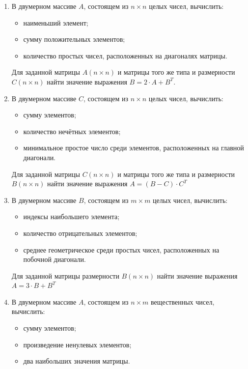 \begin{enumerate}
\item В двумерном массиве $A$, состоящем из $n\times n$ целых чисел, вычислить: 
\begin{itemize}
\item наименьший элемент;
\item сумму положительных элементов;
\item количество простых чисел, расположенных на диагоналях матрицы.
\end{itemize}
Для заданной матрицы $A(n\times n)$ и матрицы того же типа и размерности
$C(n\times n)$ найти значение выражения  $B=2\cdot A+B^T$.

\item В двумерном массиве $C$, состоящем из $n\times n$ целых чисел, вычислить:
\begin{itemize}
\item сумму элементов;
\item количество нечётных элементов;
\item минимальное простое число среди элементов, расположенных на главной диагонали.
\end{itemize}

Для заданной матрицы $C(n\times n)$ и матрицы того же типа и размерности
$B(n\times n)$ найти значение выражения  $A=(B-C)\cdot C^T$  

\item В двумерном массиве $B$, состоящем из $m\times m$ целых чисел, вычислить: 
\begin{itemize}
\item индексы наибольшего элемента;
\item количество отрицательных элементов;
\item среднее геометрическое среди простых чисел, расположенных на побочной диагонали.
\end{itemize}

Для заданной матрицы размерности $B(n\times n)$ найти значение выражения  $A=3\cdot B+B^T$  

\item В двумерном массиве $A$, состоящем из $n\times m$ вещественных чисел, вычислить: 
\begin{itemize}
\item сумму элементов;
\item произведение ненулевых элементов;
\item два наибольших значения матрицы.
\end{itemize}


\end{enumerate}
